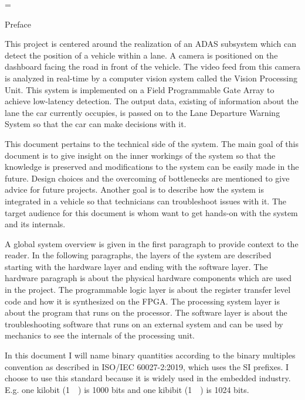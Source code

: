 \documentclass{matthijs}
\begin{document}
	\emergencystretch=\maxdimen

	\begin{hoofdstuk}{Preface}

		This project is centered around the realization of an ADAS subsystem which can detect the position of a vehicle within a lane.
		A camera is positioned on the dashboard facing the road in front of the vehicle.
		The video feed from this camera is analyzed in real-time by a computer vision system called the Vision Processing Unit.
		This system is implemented on a Field Programmable Gate Array to achieve low-latency detection.
		The output data, existing of information about the lane the car currently occupies, is passed on to the Lane Departure Warning System so that the car can make decisions with it.

		\bigskip

		This document pertains to the technical side of the system.
		The main goal of this document is to give insight on the inner workings of the system so that the knowledge is preserved and modifications to the system can be easily made in the future.
		Design choices and the overcoming of bottlenecks are mentioned to give advice for future projects.
		Another goal is to describe how the system is integrated in a vehicle so that technicians can troubleshoot issues with it.
		The target audience for this document is whom want to get hands-on with the system and its internals.

		\bigskip

		A global system overview is given in the first paragraph to provide context to the reader.
		In the following paragraphs, the layers of the system are described starting with the hardware layer and ending with the software layer.
		The hardware paragraph is about the physical hardware components which are used in the project.
		The programmable logic layer is about the register transfer level code and how it is synthesized on the FPGA.
		The processing system layer is about the program that runs on the processor.
		The software layer is about the troubleshooting software that runs on an external system and can be used by mechanics to see the internals of the processing unit.

		\bigskip

		In this document I will name binary quantities according to the binary multiples convention as described in ISO/IEC 60027-2:2019, which uses the SI prefixes.
		I choose to use this standard because it is widely used in the embedded industry.
		E.g. one kilobit (\qty{1}{\kilo\bit}) is 1000 bits and one kibibit (\qty{1}{\kibi\bit}) is 1024 bits.

	\end{hoofdstuk}
\end{document}
